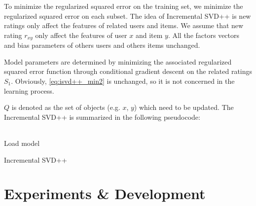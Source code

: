 \documentclass[oneside,13pt]{extreport}
\begin{document}
To minimize the regularized squared error on the training set, we minimize the regularized squared error on each subset. The idea of Incremental SVD++ is new ratings only affect the features of related users and items. We assume that new rating $r_{xy}$ only affect the features of user $x$ and item $y$. All the factors vectors and bias parameters of others users and others items unchanged.  

Model parameters are determined by minimizing the associated regularized squared error function through conditional gradient descent on the related ratings $S_1$. Obviously, \ref{eq:isvd++_min2} is unchanged, so it is not concerned in the learning process. 

$Q$ is denoted as the set of objects (e.g. $x$, $y$) which need to be updated. The Incremental SVD++ is summarized in the following pseudocode:
\\\\

\begin{algorithm}[H]
 Load model\;
 \caption{Incremental SVD++}
\end{algorithm}


\chapter{Experiments \& Development}
\label{experiments}
\end{document}
